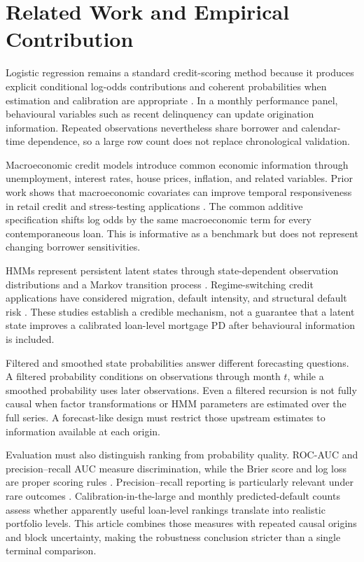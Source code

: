 \documentclass[12pt]{article}
\begin{document}
\section{Related Work and Empirical Contribution}

Logistic regression remains a standard credit-scoring method because it produces explicit conditional log-odds contributions and coherent probabilities when estimation and calibration are appropriate \citep{hand_henley_1997,thomas2000survey,costa2020logistic}. In a monthly performance panel, behavioural variables such as recent delinquency can update origination information. Repeated observations nevertheless share borrower and calendar-time dependence, so a large row count does not replace chronological validation.

Macroeconomic credit models introduce common economic information through unemployment, interest rates, house prices, inflation, and related variables. Prior work shows that macroeconomic covariates can improve temporal responsiveness in retail credit and stress-testing applications \citep{bellotti2009credit,bellotti2013stress}. The common additive specification shifts log odds by the same macroeconomic term for every contemporaneous loan. This is informative as a benchmark but does not represent changing borrower sensitivities.

HMMs represent persistent latent states through state-dependent observation distributions and a Markov transition process \citep{rabiner1989hmm,hamilton1989regimes}. Regime-switching credit applications have considered migration, default intensity, and structural default risk \citep{bangia_et_al_2002,yu2018modeling,milidonis_chisholm_2024}. These studies establish a credible mechanism, not a guarantee that a latent state improves a calibrated loan-level mortgage PD after behavioural information is included.

Filtered and smoothed state probabilities answer different forecasting questions. A filtered probability conditions on observations through month $t$, while a smoothed probability uses later observations. Even a filtered recursion is not fully causal when factor transformations or HMM parameters are estimated over the full series. A forecast-like design must restrict those upstream estimates to information available at each origin.

Evaluation must also distinguish ranking from probability quality. ROC-AUC and precision--recall AUC measure discrimination, while the Brier score and log loss are proper scoring rules \citep{brier1950,gneiting_raftery_2007}. Precision--recall reporting is particularly relevant under rare outcomes \citep{davis_goadrich_2006,saito2015prroc}. Calibration-in-the-large and monthly predicted-default counts assess whether apparently useful loan-level rankings translate into realistic portfolio levels. This article combines those measures with repeated causal origins and block uncertainty, making the robustness conclusion stricter than a single terminal comparison.
\end{document}
